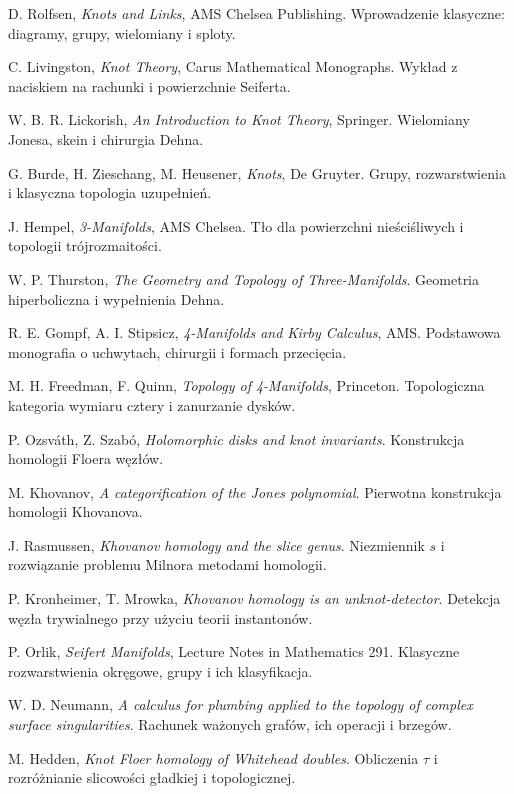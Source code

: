 \begin{enumerate}[label={[\arabic*]},leftmargin=*,itemsep=3pt]
\item D. Rolfsen, \emph{Knots and Links}, AMS Chelsea Publishing.
Wprowadzenie klasyczne: diagramy, grupy, wielomiany i sploty.
\item C. Livingston, \emph{Knot Theory}, Carus Mathematical Monographs.
Wykład z naciskiem na rachunki i powierzchnie Seiferta.
\item W. B. R. Lickorish, \emph{An Introduction to Knot Theory}, Springer.
Wielomiany Jonesa, skein i chirurgia Dehna.
\item G. Burde, H. Zieschang, M. Heusener, \emph{Knots}, De Gruyter.
Grupy, rozwarstwienia i klasyczna topologia uzupełnień.
\item J. Hempel, \emph{3-Manifolds}, AMS Chelsea.
Tło dla powierzchni nieściśliwych i topologii trójrozmaitości.
\item W. P. Thurston, \emph{The Geometry and Topology of Three-Manifolds}.
Geometria hiperboliczna i wypełnienia Dehna.
\item R. E. Gompf, A. I. Stipsicz, \emph{4-Manifolds and Kirby Calculus}, AMS.
Podstawowa monografia o uchwytach, chirurgii i formach przecięcia.
\item M. H. Freedman, F. Quinn, \emph{Topology of 4-Manifolds}, Princeton.
Topologiczna kategoria wymiaru cztery i zanurzanie dysków.
\item P. Ozsváth, Z. Szabó, \emph{Holomorphic disks and knot invariants}.
Konstrukcja homologii Floera węzłów.
\item M. Khovanov, \emph{A categorification of the Jones polynomial}.
Pierwotna konstrukcja homologii Khovanova.
\item J. Rasmussen, \emph{Khovanov homology and the slice genus}.
Niezmiennik $s$ i rozwiązanie problemu Milnora metodami homologii.
\item P. Kronheimer, T. Mrowka, \emph{Khovanov homology is an unknot-detector}.
Detekcja węzła trywialnego przy użyciu teorii instantonów.
\item P. Orlik, \emph{Seifert Manifolds}, Lecture Notes in Mathematics 291.
Klasyczne rozwarstwienia okręgowe, grupy i ich klasyfikacja.
\item W. D. Neumann, \emph{A calculus for plumbing applied to the topology of complex surface singularities}.
Rachunek ważonych grafów, ich operacji i brzegów.
\item M. Hedden, \emph{Knot Floer homology of Whitehead doubles}.
Obliczenia $\tau$ i rozróżnianie slicowości gładkiej i topologicznej.

\end{enumerate}
